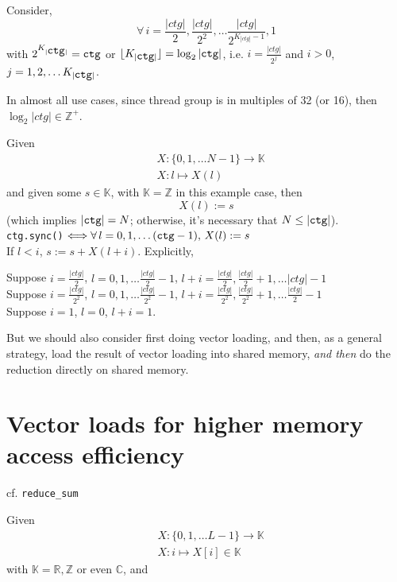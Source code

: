 \documentclass[10pt]{amsart}
\begin{document}
\begin{multicols*}{2}
Consider, 
\[
\forall \, i = \frac{ | ctg |}{2}, \frac{| ctg|}{2^2}, \dots \frac{| ctg|}{2^{K_{| ctg |}-1}}, 1
\]
with $2^{K_{|\verb|ctg||}} = \verb|ctg|$ or $\lfloor K_{|\verb|ctg||} \rfloor = \log_2{| \verb|ctg||}$, i.e. $i = \frac{ |ctg| }{2^j}$ and $i>0$, $j=1,2,\dots K_{|\verb|ctg||}$.  

In almost all use cases, since thread group is in multiples of 32 (or 16), then $\log_2{ |ctg|} \in \mathbb{Z}^+$.  

Given 
\[
\begin{aligned}
& X:\lbrace 0 ,1,\dots N-1 \rbrace  \to \mathbb{K} \\ 
& X: l \mapsto X(l) 
\end{aligned}
\]
and given some $s\in \mathbb{K}$, with $\mathbb{K} = \mathbb{Z}$ in this example case, then 
\[
X(l):= s
\]
(which implies $|\verb|ctg|| =N$; otherwise, it's necessary that $N \leq |\verb|ctg||$).  \\
\verb|ctg.sync()| $\Longleftrightarrow  \forall \, l = 0,1,\dots (\verb|ctg|-1), \, X(l):= s $  \\

If $l<i$, $s:= s + X(l+i)$.  Explicitly, 

Suppose $i = \frac{ |ctg|}{2}$, $l=0,1,\dots \frac{|ctg|}{2} - 1$, $l+i = \frac{ |ctg|}{2}, \frac{ |ctg|}{2} + 1, \dots |ctg| - 1 $ \\ 
Suppose $i = \frac{ |ctg|}{2^2}$, $l=0,1,\dots \frac{|ctg|}{2^2} - 1$, $l+i = \frac{ |ctg|}{2^2}, \frac{ |ctg|}{2^2} + 1, \dots \frac{|ctg|}{2} - 1 $ \\ 
Suppose $i=1$, $l=0$, $l+i=1$.  

But we should also consider first doing vector loading, and then, as a general strategy, load the result of vector loading into shared memory, \emph{and then} do the reduction directly on shared memory.  

\section{Vector loads for higher memory access efficiency}  

cf. \verb|reduce_sum|  

Given 
\[
\begin{aligned}
	& X : \lbrace 0 ,1,\dots L-1\rbrace \to \mathbb{K}  \\
	& X:i \mapsto X[i] \in \mathbb{K}  
\end{aligned}
\] with $\mathbb{K} = \mathbb{R}, \mathbb{Z}$ or even $\mathbb{C}$, and  


\end{multicols*}
\end{document}
